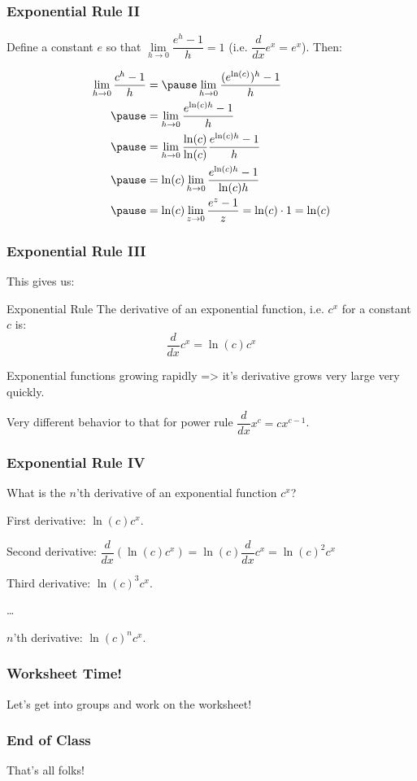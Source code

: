 \documentclass{ltx-talk}
\begin{document}
\begin{frame}
  \frametitle{Exponential Rule II}

  Define a constant $e$ so that $\lim\limits_{h \rightarrow 0} \dfrac{e^h - 1}{h} = 1$ (i.e. $\dfrac{d}{dx} e^x = e^x$). Then:

  \begin{align}
    \lim\limits_{h \rightarrow 0} \dfrac{c^h - 1}{h} &= \pause \lim\limits_{h \rightarrow 0} \dfrac{(e^{\ln(c)})^h - 1}{h} \\ \pause
                                                     &= \lim\limits_{h \rightarrow 0} \dfrac{e^{\ln(c) h} - 1}{h} \\ \pause
                                                     &= \lim\limits_{h \rightarrow 0} \dfrac{\ln(c)}{\ln(c)} \dfrac{e^{\ln(c) h} - 1}{h} \\ \pause
                                                     &= \ln(c) \lim\limits_{h \rightarrow 0} \dfrac{e^{\ln(c) h} - 1}{\ln(c) h} \\ \pause
                                                     &= \ln(c) \lim\limits_{z \rightarrow 0} \dfrac{e^z - 1}{z} = \ln(c) \cdot 1 = \ln(c)
  \end{align}
\end{frame}

\begin{frame}
  \frametitle{Exponential Rule III}
  This gives us:

  \begin{block}{Exponential Rule}
    The derivative of an exponential function, i.e. $c^x$ for a constant $c$ is:
    \begin{equation}
      \dfrac{d}{dx} c^x = \ln(c) c^x
    \end{equation}
  \end{block} \pause

  Exponential functions growing rapidly => it's derivative grows very large very quickly.

  Very different behavior to that for power rule $\dfrac{d}{dx} x^c = cx^{c - 1}$.
\end{frame}

\begin{frame}
  \frametitle{Exponential Rule IV}

  What is the $n$'th derivative of an exponential function $c^x$? \pause

  First derivative: $\ln(c) c^x$. \pause

  Second derivative: $\dfrac{d}{dx} (\ln(c) c^x) = \ln(c) \dfrac{d}{dx} c^x = \ln(c)^2 c^x$ \pause

  Third derivative: $\ln(c)^3 c^x$. \pause

  \ldots

  $n$'th derivative: $\ln(c)^n c^x$.
\end{frame}

\begin{frame}
  \frametitle{Worksheet Time!}

  Let's get into groups and work on the worksheet!
\end{frame}

\begin{frame}
  \frametitle{End of Class}

  That's all folks!
\end{frame}
\end{document}
